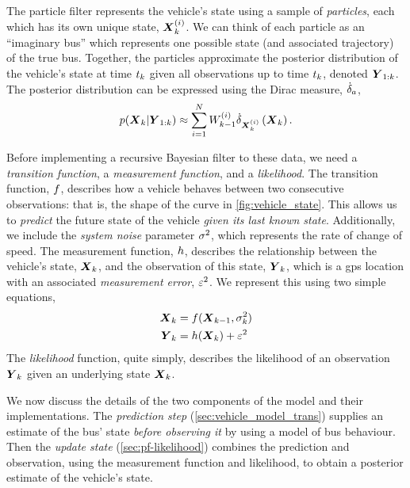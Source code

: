 The particle filter represents the vehicle's state using a sample of \emph{particles}, each which has its own unique state, $\boldsymbol{X}_k^{(i)}$. We can think of each particle as an ``imaginary bus'' which represents one possible state (and associated trajectory) of the true bus. Together, the particles approximate the posterior distribution of the vehicle's state at time $t_k$ given all observations up to time $t_k$, denoted $\boldsymbol{Y}_{1:k}$. The posterior distribution can be expressed using the Dirac measure, $\dot\delta_a$,
\begin{equation}
\label{eq:vehicle_state_dirac}
p(\boldsymbol{X}_k | \boldsymbol{Y}_{1:k}) \approx
\sum_{i=1}^N W^{(i)}_{k-1} \dot\delta_{\boldsymbol{X}_k^{(i)}}\left(\boldsymbol{X}_k\right).
\end{equation}


Before implementing a recursive Bayesian filter to these data, we need a \emph{transition function}, a \emph{measurement function}, and a \emph{likelihood}. The transition function, $f$, describes how a vehicle behaves between two consecutive observations: that is, the shape of the curve in \cref{fig:vehicle_state}. This allows us to \emph{predict} the future state of the vehicle \emph{given its last known state}. Additionally, we include the \emph{system noise} parameter $\sigma^2$, which represents the rate of change of speed. The measurement function, $h$, describes the relationship between the vehicle's state, $\boldsymbol{X}_k$, and the observation of this state, $\boldsymbol{Y}_k$, which is a \gls{gps} location with an associated \emph{measurement error}, $\varepsilon^2$. We represent this using two simple equations,
\begin{equation}
\label{eq:vehicle_model}
\begin{split}
\boldsymbol{X}_k &= f(\boldsymbol{X}_{k-1}, \sigma^2_k) \\
\boldsymbol{Y}_k &= h(\boldsymbol{X}_k) + \varepsilon^2
\end{split}
\end{equation}
The \emph{likelihood} function, quite simply, describes the likelihood of an observation $\boldsymbol{Y}_k$ given an underlying state $\boldsymbol{X}_k$.


We now discuss the details of the two components of the model and their implementations. The \emph{prediction step} (\cref{sec:vehicle_model_trans}) supplies an estimate of the bus' state \emph{before observing it} by using a model of bus behaviour. Then the \emph{update state} (\cref{sec:pf-likelihood}) combines the prediction and observation, using the measurement function and likelihood, to obtain a posterior estimate of the vehicle's state.
